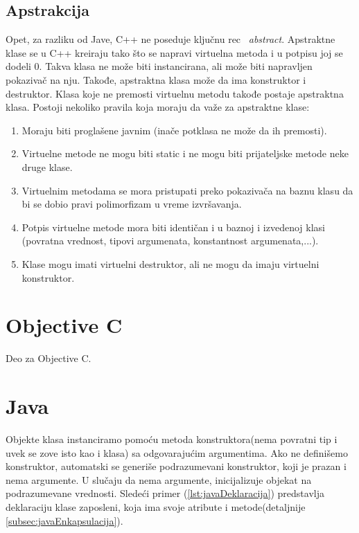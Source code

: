 \documentclass[a4paper]{article}
\begin{document}
\subsection{Apstrakcija}
\label{subsec:c++Apstrakcija}
Opet, za razliku od Jave, C++ ne poseduje ključnu rec ~{\em abstract}. Apstraktne klase se u C++ kreiraju tako što se napravi virtuelna metoda i u potpisu joj se dodeli 0. Takva klasa ne može biti instancirana, ali može biti napravljen pokazivač na nju. Takođe, apstraktna klasa može da ima konstruktor i destruktor. Klasa koje ne premosti virtuelnu metodu takođe postaje apstraktna klasa. Postoji nekoliko pravila koja moraju da važe za apstraktne klase:
\begin{enumerate}
	\item Moraju biti proglašene javnim (inače potklasa ne može da ih premosti).
	\item Virtuelne metode ne mogu biti static i ne mogu biti prijateljske metode neke druge klase.
	\item Virtuelnim metodama se mora pristupati preko pokazivača na baznu klasu da bi se dobio pravi polimorfizam u vreme izvršavanja.
	\item Potpis virtuelne metode mora biti identičan i u baznoj i izvedenoj klasi (povratna vrednost, tipovi argumenata, konstantnost argumenata,...).
	\item Klase mogu imati virtuelni destruktor, ali ne mogu da imaju virtuelni konstruktor.
\end{enumerate}
\section{Objective C}
\label{sec:objectivec}
Deo za Objective C.

\section{Java}
\label{sec:java}

Objekte klasa instanciramo pomoću metoda konstruktora(nema povratni tip i uvek se zove isto kao i klasa) sa odgovarajućim argumentima. Ako ne definišemo konstruktor, automatski se generiše podrazumevani konstruktor, koji je prazan i nema argumente. U slučaju da nema argumente, inicijalizuje objekat na podrazumevane vrednosti. Sledeći primer (\ref{lst:javaDeklaracija}) predstavlja deklaraciju klase zaposleni, koja ima svoje atribute i metode(detaljnije \ref{subsec:javaEnkapsulacija}).
\end{document}
